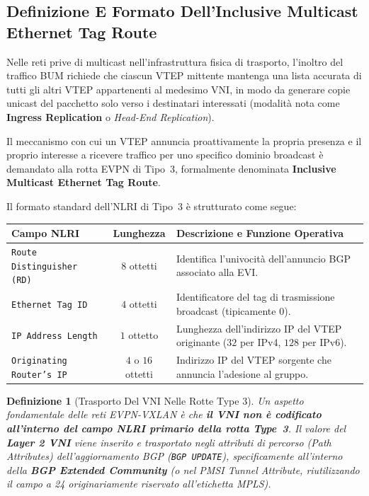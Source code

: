 \documentclass[11pt, a4paper]{article}
\newtheorem{theorem}{Definizione}
\begin{document}
\subsection{Definizione E Formato Dell'Inclusive Multicast Ethernet Tag Route}

Nelle reti prive di multicast nell'infrastruttura fisica di trasporto, l'inoltro del traffico BUM richiede che ciascun VTEP mittente mantenga una lista accurata di tutti gli altri VTEP appartenenti al medesimo VNI, in modo da generare copie unicast del pacchetto solo verso i destinatari interessati (modalità nota come \textbf{Ingress Replication} o \emph{Head-End Replication}).

Il meccanismo con cui un VTEP annuncia proattivamente la propria presenza e il proprio interesse a ricevere traffico per uno specifico dominio broadcast è demandato alla rotta EVPN di Tipo~3, formalmente denominata \textbf{Inclusive Multicast Ethernet Tag Route}.


Il formato standard dell'NLRI di Tipo~3 è strutturato come segue:
\begin{center}
\begin{tabular}{|l|c|p{8cm}|}
\hline
\textbf{Campo NLRI} & \textbf{Lunghezza} & \textbf{Descrizione e Funzione Operativa} \\ \hline
\texttt{Route Distinguisher (RD)} & $8$ ottetti & Identifica l'univocità dell'annuncio BGP associato alla EVI. \\ \hline
\texttt{Ethernet Tag ID} & $4$ ottetti & Identificatore del tag di trasmissione broadcast (tipicamente \num{0}). \\ \hline
\texttt{IP Address Length} & $1$ ottetto & Lunghezza dell'indirizzo IP del VTEP originante ($32$ per IPv4, $128$ per IPv6). \\ \hline
\texttt{Originating Router's IP} & $4$ o $16$ ottetti & Indirizzo IP del VTEP sorgente che annuncia l'adesione al gruppo. \\ \hline
\end{tabular}
\end{center}

\begin{theorem}[Trasporto Del VNI Nelle Rotte Type 3]
Un aspetto fondamentale delle reti EVPN-VXLAN è che \textbf{il VNI non è codificato all'interno del campo NLRI primario della rotta Type~3}.
Il valore del \textbf{Layer 2 VNI} viene inserito e trasportato negli attributi di percorso (\emph{Path Attributes}) dell'aggiornamento BGP (\texttt{BGP UPDATE}), specificamente all'interno della \textbf{BGP Extended Community} (o nel PMSI Tunnel Attribute, riutilizzando il campo a \SI{24}{\bit} originariamente riservato all'etichetta MPLS).
\end{theorem}
\end{document}
